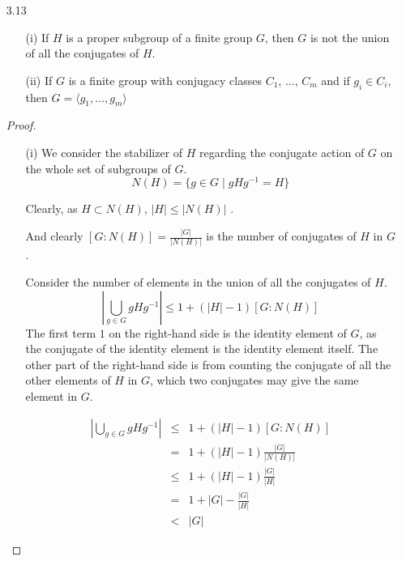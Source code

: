 \documentclass{article}
\begin{document}
\begin{enumerate}
    \item [3.13]
          \begin{enumerate}
              \item [(i)] If $H$ is a proper subgroup of a finite group $G$,
                    then $G$ is not the union of all the conjugates of $H$.
              \item [(ii)] If $G$ is a finite group with conjugacy classes
                    $C_1$, $\dots$, $C_{m}$ and if $g_{i} \in C_{i}$,
                    then $G = \langle g_{1}, \dots, g_{m} \rangle$
          \end{enumerate}
          \begin{proof}
              \begin{enumerate}
                  \item [(i)] We consider the stabilizer of $H$
                        regarding the conjugate action of $G$ on the whole set of subgroups of $G$.
                        \begin{equation}
                            N(H) = \{g \in G \mid gHg^{-1} = H\}
                        \end{equation}

                        Clearly, as $H \subset N(H)$, $|H| \le |N(H)|$ .

                        And clearly $\left[G: N(H)\right] = \frac{|G|}{|N(H)|}$ is the number of conjugates of $H$ in $G$.

                        Consider the number of elements in the union of all the conjugates of $H$.
                        \begin{equation}
                            \left| \bigcup_{g \in G} gHg^{-1} \right| \le 1 + ( |H| -1 ) \left[G: N(H)\right]
                        \end{equation}
                        The first term $1$ on the right-hand side is the identity element of $G$,
                        as the conjugate of the identity element is the identity element itself.
                        The other part of the right-hand side is from counting the conjugate of all the other elements of $H$ in $G$,
                        which two conjugates may give the same element in $G$.

                        \begin{eqnarray}
                            \left| \bigcup_{g \in G} gHg^{-1} \right| &\le& 1 + ( |H| -1 ) \left[G: N(H)\right] \\
                            &=& 1 + ( |H| -1 ) \frac{|G|}{|N(H)|} \\
                            &\le& 1 + ( |H| -1 ) \frac{|G|}{|H|} \\
                            &=& 1 + |G| - \frac{|G|}{|H|} \\
                            &<& |G|
                        \end{eqnarray}


\end{enumerate}
\end{proof}
\end{enumerate}
\end{document}

